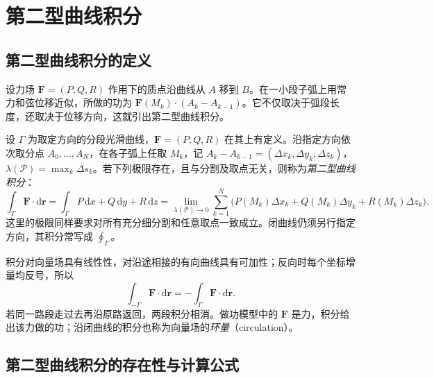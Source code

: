 \section{第二型曲线积分}
\label{sec:line-integrals-of-the-second-kind}

\subsection{第二型曲线积分的定义}
\label{subsec:definition-of-line-integrals-of-the-second-kind}

设力场 $\boldsymbol F=(P,Q,R)$ 作用下的质点沿曲线从 $A$ 移到 $B$。在一小段子弧上用常力和弦位移近似，所做的功为 $\boldsymbol F(M_k)\cdot(A_k-A_{k-1})$。它不仅取决于弧段长度，还取决于位移方向，这就引出第二型曲线积分。

\begin{definition}
\label{def:line-integral-second-kind}
设 $\Gamma$ 为取定方向的分段光滑曲线，$\boldsymbol F=(P,Q,R)$ 在其上有定义。沿指定方向依次取分点 $A_0,\ldots,A_N$，在各子弧上任取 $M_k$，记 $A_k-A_{k-1}=(\Delta x_k,\Delta y_k,\Delta z_k)$，$\lambda(\mathcal P)=\max_k\Delta s_k$。若下列极限存在，且与分割及取点无关，则称为\emph{第二型曲线积分}：
\begin{equation}
\label{eq:second-line-integral-definition}
    \int_\Gamma\boldsymbol F\cdot\mathrm d\boldsymbol r
    =\int_\Gamma P\,\mathrm dx+Q\,\mathrm dy+R\,\mathrm dz
    =\lim_{\lambda(\mathcal P)\to0}
      \sum_{k=1}^N\bigl(P(M_k)\Delta x_k+Q(M_k)\Delta y_k+R(M_k)\Delta z_k\bigr).
\end{equation}
这里的极限同样要求对所有充分细分割和任意取点一致成立。闭曲线仍须另行指定方向，其积分常写成 $\oint_\Gamma$。
\end{definition}

积分对向量场具有线性性，对沿途相接的有向曲线具有可加性；反向时每个坐标增量均反号，所以
\[
    \int_{-\Gamma}\boldsymbol F\cdot\mathrm d\boldsymbol r
    =-\int_\Gamma\boldsymbol F\cdot\mathrm d\boldsymbol r.
\]
若同一路段走过去再沿原路返回，两段积分相消。做功模型中的 $\boldsymbol F$ 是力，积分给出该力做的功；沿闭曲线的积分也称为向量场的\emph{环量}（circulation）。

\subsection{第二型曲线积分的存在性与计算公式}
\label{subsec:existence-and-evaluation-of-line-integrals-of-the-second-kind}

